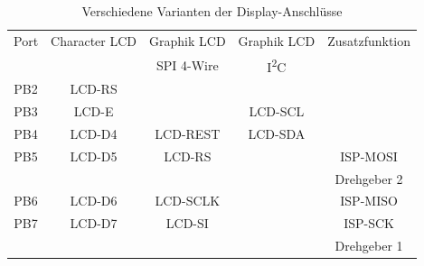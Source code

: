\begin{table}[H]
  \begin{center}
    \begin{tabular}{| c || c | c | c | c |}
    \hline
      Port & Character LCD &  Graphik LCD & Graphik LCD  & Zusatzfunktion      \\
           &               &  SPI 4-Wire  &  I\textsuperscript{2}C         &                     \\
    \hline
    \hline
    PB2    &  LCD-RS         &            &             &       \\
    \hline
    PB3    &  LCD-E          &            &  LCD-SCL    &       \\
    \hline
    PB4    &  LCD-D4         & LCD-REST   &  LCD-SDA    &       \\
    \hline
    PB5    &  LCD-D5         & LCD-RS     &             & ISP-MOSI \\
           &                 &            &             & Drehgeber 2 \\
    \hline
    PB6    &  LCD-D6         & LCD-SCLK   &             & ISP-MISO \\
    \hline
    PB7    &  LCD-D7         & LCD-SI     &             & ISP-SCK  \\
           &                 &            &             & Drehgeber 1 \\
    \hline
    \end{tabular}
  \end{center}
  \caption{Verschiedene Varianten der Display-Anschlüsse}
  \label{tab:mega644-display}
\end{table}



